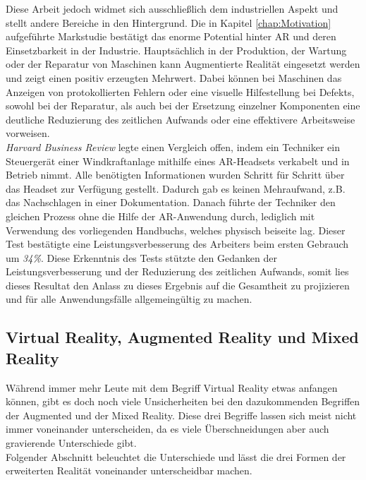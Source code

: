 Diese Arbeit jedoch widmet sich ausschließlich dem industriellen Aspekt und stellt andere Bereiche in den Hintergrund. Die in Kapitel 
\ref{chap:Motivation} aufgeführte Markstudie bestätigt das enorme Potential hinter \acl{AR} und deren Einsetzbarkeit in der Industrie.
Hauptsächlich in der Produktion, der Wartung oder der Reparatur von Maschinen kann Augmentierte Realität eingesetzt werden und zeigt einen 
positiv erzeugten Mehrwert. Dabei können bei Maschinen das Anzeigen von protokollierten Fehlern oder eine visuelle Hilfestellung bei Defekts, sowohl bei der 
Reparatur, als auch bei der Ersetzung einzelner Komponenten eine deutliche Reduzierung des zeitlichen Aufwands oder eine effektivere Arbeitsweise 
vorweisen. 
\\
\textit{Harvard Business Review} legte einen Vergleich offen, indem ein Techniker ein Steuergerät einer Windkraftanlage mithilfe 
eines \acs{AR}-Headsets verkabelt und in Betrieb nimmt. Alle benötigten Informationen wurden Schritt für Schritt über das Headset zur Verfügung 
gestellt. Dadurch gab es keinen Mehraufwand, z.B. das Nachschlagen in einer Dokumentation. Danach führte der Techniker den gleichen Prozess 
ohne die Hilfe der AR-Anwendung durch, lediglich mit Verwendung des vorliegenden Handbuchs, welches physisch beiseite lag.
Dieser Test bestätigte eine Leistungsverbesserung des Arbeiters beim ersten Gebrauch um \textit{34\%}.\cite{harvardbr.2017m} Diese Erkenntnis 
des Tests stützte den Gedanken der Leistungsverbesserung und der Reduzierung des zeitlichen Aufwands, somit lies dieses Resultat den 
Anlass zu dieses Ergebnis auf die Gesamtheit zu projizieren und für alle Anwendungsfälle allgemeingültig zu machen. 


\subsection{Virtual Reality, Augmented Reality und Mixed Reality}
Während immer mehr Leute mit dem Begriff Virtual Reality etwas anfangen können, gibt es doch noch viele Unsicherheiten bei den dazukommenden 
Begriffen der Augmented und der Mixed Reality. Diese drei Begriffe lassen sich meist nicht immer voneinander unterscheiden, da es viele 
Überschneidungen aber auch gravierende Unterschiede gibt. 
\\ 
Folgender Abschnitt beleuchtet die Unterschiede und lässt die drei Formen der erweiterten Realität voneinander unterscheidbar machen.
